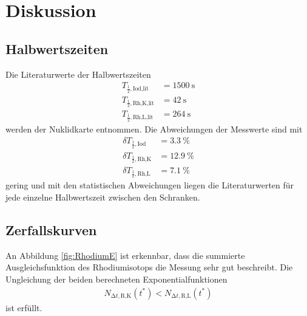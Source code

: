 \section{Diskussion}
\label{sec:Diskussion}

\subsection{Halbwertszeiten}

Die Literaturwerte der Halbwertszeiten
\begin{align}
  T_{\frac{1}{2},\text{Iod,lit}} & = \SI{1500}{\second} \\
  T_{\frac{1}{2},\text{Rh,K,lit}} & = \SI{42}{\second} \\
  T_{\frac{1}{2},\text{Rh,L,lit}} & = \SI{264}{\second}
\end{align}
werden der Nuklidkarte \cite{nuklid} entnommen.
Die Abweichungen der Messwerte sind mit
\begin{align}
  \delta T_{\frac{1}{2},\text{Iod}} & = \SI{3.3}{\percent} \\
  \delta T_{\frac{1}{2},\text{Rh,K}} & = \SI{12.9}{\percent} \\
  \delta T_{\frac{1}{2},\text{Rh,L}} & = \SI{7.1}{\percent}
\end{align}
gering und mit den statistischen Abweichungen liegen die Literaturwerten
für jede einzelne Halbwertszeit zwischen den Schranken.

\subsection{Zerfallskurven}

An Abbildung \ref{fig:RhodiumE} ist erkennbar, dass die summierte
Ausgleichsfunktion des Rhodiumisotops die Messung sehr gut beschreibt.
Die Ungleichung der beiden berechneten Exponentialfunktionen
\begin{align}
  N_{\increment t,\text{R,K}} (t^*) < N_{\increment t,\text{R,L}} (t^*)
\end{align}
ist erfüllt.
